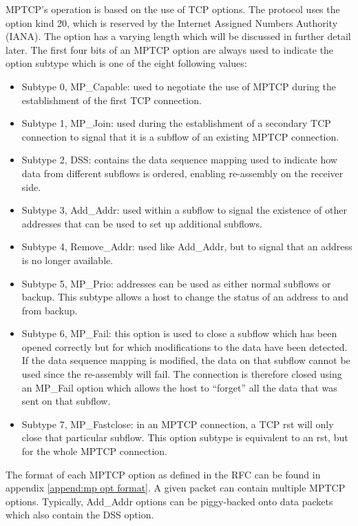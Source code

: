 MPTCP's operation is based on the use of TCP options. The protocol uses the option kind 20, which is reserved by the Internet Assigned Numbers Authority (IANA). The option has a varying length which will be discussed in further detail later. The first four bits of an MPTCP option are always used to indicate the option subtype which is one of the eight following values:

\begin{itemize}
\item Subtype 0, MP\_Capable: used to negotiate the use of MPTCP during the establishment of the first TCP connection.
\item Subtype 1, MP\_Join: used during the establishment of a secondary TCP connection to signal that it is a subflow of an existing MPTCP connection.
\item Subtype 2, DSS: contains the data sequence mapping used to indicate how data from different subflows is ordered, enabling re-assembly on the receiver side.
\item Subtype 3, Add\_Addr: used within a subflow to signal the existence of other addresses that can be used to set up additional subflows.
\item Subtype 4, Remove\_Addr: used like Add\_Addr, but to signal that an address is no longer available.
\item Subtype 5, MP\_Prio: addresses can be used as either normal subflows or backup. This subtype allows a host to change the status of an address to and from backup.
\item Subtype 6, MP\_Fail: this option is used to close a subflow which has been opened correctly but for which modifications to the data have been detected. If the data sequence mapping is modified, the data on that subflow cannot be used since the re-assembly will fail. The connection is therefore closed using an MP\_Fail option which allows the host to ``forget'' all the data that was sent on that subflow.
\item Subtype 7, MP\_Fastclose: in an MPTCP connection, a TCP rst will only close that particular subflow. This option subtype is equivalent to an rst, but for the whole MPTCP connection.
\end{itemize}

The format of each MPTCP option as defined in the RFC can be found in appendix \ref{append:mp opt format}. A given packet can contain multiple MPTCP options. Typically, Add\_Addr options can be piggy-backed onto data packets which also contain the DSS option.\\

